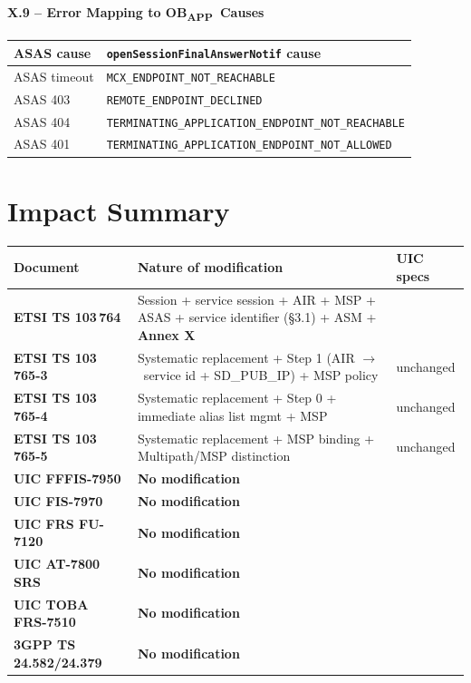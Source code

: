 \documentclass[11pt,a4paper]{article}
\newcommand{\cmark}{\ding{51}}
\newcommand{\OBAPP}{OB\textsubscript{APP}}
\newcommand{\arr}{$\to$}
\begin{document}
\paragraph{X.9 -- Error Mapping to \OBAPP\ Causes}
\label{x9}
\begin{longtable}{p{5.5cm} p{8cm}}
  \toprule ASAS cause & \texttt{openSessionFinalAnswerNotif} cause \\ \midrule \endhead
  ASAS timeout & \texttt{MCX\_ENDPOINT\_NOT\_REACHABLE} \\
  ASAS 403 & \texttt{REMOTE\_ENDPOINT\_DECLINED} \\
  ASAS 404 & \texttt{TERMINATING\_APPLICATION\_ENDPOINT\_NOT\_REACHABLE} \\
  ASAS 401 & \texttt{TERMINATING\_APPLICATION\_ENDPOINT\_NOT\_ALLOWED} \\
  \bottomrule
\end{longtable}

\section{Impact Summary}

\begin{longtable}{p{5cm} p{6.5cm} p{2cm}}
  \toprule Document & Nature of modification & UIC specs \\ \midrule \endhead
  \textbf{ETSI TS 103\,764} & Session + service session + AIR + MSP + ASAS +
    service identifier (§3.1) + ASM + \textbf{Annex X} & \\
  \textbf{ETSI TS 103\,765-3} & Systematic replacement + Step 1
    (AIR \arr\ service id + SD\_PUB\_IP) + MSP policy & unchanged \\
  \textbf{ETSI TS 103\,765-4} & Systematic replacement + Step 0 +
    immediate alias list mgmt + MSP & unchanged \\
  \textbf{ETSI TS 103\,765-5} & Systematic replacement + MSP binding +
    Multipath/MSP distinction & unchanged \\
  \textbf{UIC FFFIS-7950} & \textbf{No modification} & \cmark \\
  \textbf{UIC FIS-7970} & \textbf{No modification} & \cmark \\
  \textbf{UIC FRS FU-7120} & \textbf{No modification} & \cmark \\
  \textbf{UIC AT-7800 SRS} & \textbf{No modification} & \cmark \\
  \textbf{UIC TOBA FRS-7510} & \textbf{No modification} & \cmark \\
  \textbf{3GPP TS 24.582/24.379} & \textbf{No modification} & \\
  \bottomrule
\end{longtable}
\end{document}
